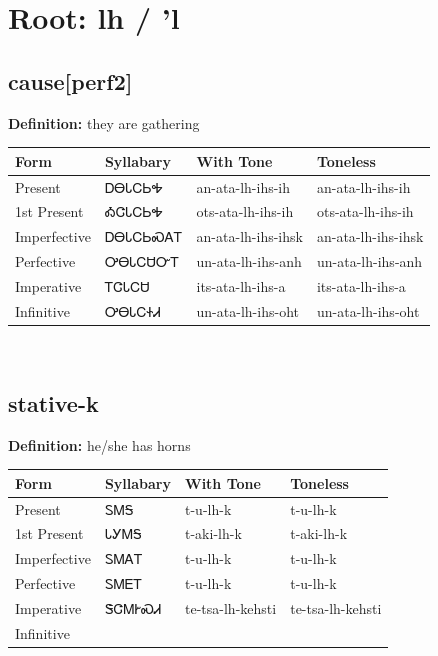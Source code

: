 \documentclass{article}%
\begin{document}
%
\normalsize%
\section*{Root: lh / 'l}%
\subsection*{cause[perf2]}%
\textbf{Definition: }%
they are gathering%
\\[0.5em]%
\begin{tabular}{|l|l|l|l|}%
\hline%
\textbf{Form}&\textbf{Syllabary}&\textbf{With Tone}&\textbf{Toneless}\\%
\hline%
Present&ᎠᎾᏓᏟᏏᎭ&an{-}ata{-}lh{-}ihs{-}ih&an{-}ata{-}lh{-}ihs{-}ih\\%
1st Present&ᎣᏣᏓᏟᏏᎭ&ots{-}ata{-}lh{-}ihs{-}ih&ots{-}ata{-}lh{-}ihs{-}ih\\%
Imperfective&ᎠᎾᏓᏟᏏᏍᎪᎢ&an{-}ata{-}lh{-}ihs{-}ihsk&an{-}ata{-}lh{-}ihs{-}ihsk\\%
Perfective&ᎤᎾᏓᏟᏌᏅᎢ&un{-}ata{-}lh{-}ihs{-}anh&un{-}ata{-}lh{-}ihs{-}anh\\%
Imperative&ᎢᏣᏓᏟᏌ&its{-}ata{-}lh{-}ihs{-}a&its{-}ata{-}lh{-}ihs{-}a\\%
Infinitive&ᎤᎾᏓᏟᏐᏗ&un{-}ata{-}lh{-}ihs{-}oht&un{-}ata{-}lh{-}ihs{-}oht\\%
\hline%
\end{tabular}%
\\[1em]%
\subsection*{stative-k}%
\textbf{Definition: }%
he/she has horns%
\\[0.5em]%
\begin{tabular}{|l|l|l|l|}%
\hline%
\textbf{Form}&\textbf{Syllabary}&\textbf{With Tone}&\textbf{Toneless}\\%
\hline%
Present&ᏚᎷᎦ&t{-}u{-}lh{-}k&t{-}u{-}lh{-}k\\%
1st Present&ᏓᎩᎷᎦ&t{-}aki{-}lh{-}k&t{-}aki{-}lh{-}k\\%
Imperfective&ᏚᎷᎪᎢ&t{-}u{-}lh{-}k&t{-}u{-}lh{-}k\\%
Perfective&ᏚᎷᎬᎢ&t{-}u{-}lh{-}k&t{-}u{-}lh{-}k\\%
Imperative&ᏕᏣᎷᎨᏍᏗ&te{-}tsa{-}lh{-}kehsti&te{-}tsa{-}lh{-}kehsti\\%
Infinitive&&&\\%
\hline%
\end{tabular}%
\\[1em]%
\end{document}
